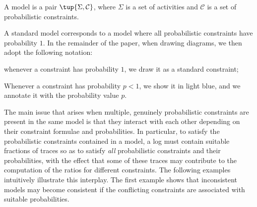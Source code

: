 \begin{definition}
A \pdeclare model is a pair $\tup{\Sigma,\mathcal{C}}$, where $\Sigma$ is a set of activities and $\mathcal{C}$ is a set of probabilistic constraints.
\end{definition}

A standard \declare model corresponds to a \pdeclare model where all probabilistic constraints have probability $1$. In the remainder of the paper, when drawing \pdeclare diagrams, we then adopt the following notation:
\begin{inparaenum}[\it (i)]
  \item whenever a constraint has probability $1$, we draw it as a standard \declare constraint;
  \item Whenever a constraint has probability $p<1$, we show it in light blue, and we annotate it with the probability value $p$.
\end{inparaenum}

The main issue that arises when multiple, genuinely probabilistic constraints are present in the same \pdeclare model is that they interact with each other depending on their constraint formulae and probabilities. In particular, to satisfy the probabilistic constraints contained in a \pdeclare model, a log must contain suitable fractions of traces so as to satisfy \emph{all} probabilistic constraints and their probabilities, with the effect that some of these traces may contribute to the computation of the ratios for different constraints.
%
The following examples intuitively illustrate this interplay. The first example shows that inconsistent \declare models may become consistent if the conflicting constraints are associated with suitable probabilities.

